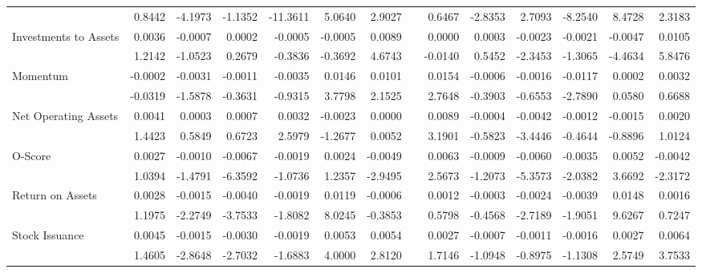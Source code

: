\begin{sidewaystable}[htbp]
{\begin{tabular}{lrrrrrrrrrrrrr}
& 0.8442 & -4.1973 & -1.1352 & -11.3611 & 5.0640 & 2.9027 &       & 0.6467 & -2.8353 & 2.7093 & -8.2540 & 8.4728 & 2.3183 \\
Investments to Assets & 0.0036 & -0.0007 & 0.0002 & -0.0005 & -0.0005 & 0.0089 &       & 0.0000 & 0.0003 & -0.0023 & -0.0021 & -0.0047 & 0.0105 \\
& 1.2142 & -1.0523 & 0.2679 & -0.3836 & -0.3692 & 4.6743 &       & -0.0140 & 0.5452 & -2.3453 & -1.3065 & -4.4634 & 5.8476 \\
Momentum & -0.0002 & -0.0031 & -0.0011 & -0.0035 & 0.0146 & 0.0101 &       & 0.0154 & -0.0006 & -0.0016 & -0.0117 & 0.0002 & 0.0032 \\
& -0.0319 & -1.5878 & -0.3631 & -0.9315 & 3.7798 & 2.1525 &       & 2.7648 & -0.3903 & -0.6553 & -2.7890 & 0.0580 & 0.6688 \\
Net Operating Assets & 0.0041 & 0.0003 & 0.0007 & 0.0032 & -0.0023 & 0.0000 &       & 0.0089 & -0.0004 & -0.0042 & -0.0012 & -0.0015 & 0.0020 \\
& 1.4423 & 0.5849 & 0.6723 & 2.5979 & -1.2677 & 0.0052 &       & 3.1901 & -0.5823 & -3.4446 & -0.4644 & -0.8896 & 1.0124 \\
O-Score & 0.0027 & -0.0010 & -0.0067 & -0.0019 & 0.0024 & -0.0049 &       & 0.0063 & -0.0009 & -0.0060 & -0.0035 & 0.0052 & -0.0042 \\
& 1.0394 & -1.4791 & -6.3592 & -1.0736 & 1.2357 & -2.9495 &       & 2.5673 & -1.2073 & -5.3573 & -2.0382 & 3.6692 & -2.3172 \\
Return on Assets & 0.0028 & -0.0015 & -0.0040 & -0.0019 & 0.0119 & -0.0006 &       & 0.0012 & -0.0003 & -0.0024 & -0.0039 & 0.0148 & 0.0016 \\
& 1.1975 & -2.2749 & -3.7533 & -1.8082 & 8.0245 & -0.3853 &       & 0.5798 & -0.4568 & -2.7189 & -1.9051 & 9.6267 & 0.7247 \\
Stock Issuance & 0.0045 & -0.0015 & -0.0030 & -0.0019 & 0.0053 & 0.0054 &       & 0.0027 & -0.0007 & -0.0011 & -0.0016 & 0.0027 & 0.0064 \\
& 1.4605 & -2.8648 & -2.7032 & -1.6883 & 4.0000 & 2.8120 &       & 1.7146 & -1.0948 & -0.8975 & -1.1308 & 2.5749 & 3.7533 \\
\bottomrule
\end{tabular}%
}
\label{tab:epu-ff5}%
\end{sidewaystable}%


